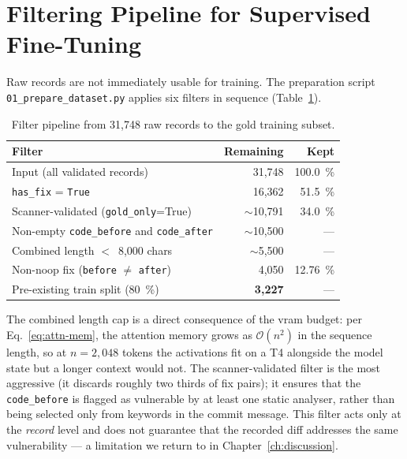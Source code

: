 \documentclass[12pt, a4paper]{report}
\begin{document}
\section{Filtering Pipeline for Supervised Fine-Tuning}
\label{sec:filter}

Raw records are not immediately usable for training. The preparation
script \texttt{01\_prepare\_dataset.py} applies six filters in sequence
(Table~\ref{tab:filter-pipeline}).

\begin{table}[H]
  \centering
  \caption{Filter pipeline from 31{,}748 raw records to the gold training subset.}
  \label{tab:filter-pipeline}
  \small
  \begin{tabular}{lrr}
    \toprule
    \textbf{Filter} & \textbf{Remaining} & \textbf{Kept} \\
    \midrule
    Input (all validated records)         & 31{,}748 & 100.0~\% \\
    \texttt{has\_fix} = \texttt{True}     & 16{,}362 & 51.5~\% \\
    Scanner-validated (\texttt{gold\_only}=True) & $\sim$10{,}791 & 34.0~\% \\
    Non-empty \texttt{code\_before} and \texttt{code\_after} & $\sim$10{,}500 & --- \\
    Combined length $<$~8{,}000 chars     & $\sim$5{,}500 & --- \\
    Non-noop fix (\texttt{before} $\neq$ \texttt{after}) & 4{,}050 & 12.76~\% \\
    Pre-existing train split (80~\%)      & \textbf{3{,}227} & --- \\
    \bottomrule
  \end{tabular}
\end{table}

The combined length cap is a direct consequence of the \gls{vram} budget:
per Eq.~\eqref{eq:attn-mem}, the attention memory grows as
\(\mathcal{O}(n^{2})\) in the sequence length, so at
\(n = 2{,}048\) tokens the activations fit on a T4 alongside the
model state but a longer context would not. The scanner-validated filter is the most aggressive (it
discards roughly two thirds of fix pairs); it ensures that the
\texttt{code\_before} is flagged as vulnerable by at least one static
analyser, rather than being selected only from keywords in the commit
message. This filter acts only at the \emph{record} level and does not
guarantee that the recorded diff addresses the same vulnerability --- a
limitation we return to in Chapter~\ref{ch:discussion}.
\end{document}
